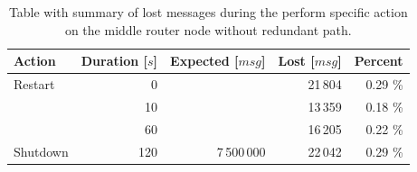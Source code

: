\begingroup
\setlength{\tabcolsep}{10pt} %
\renewcommand{\arraystretch}{1.35} %
	\begin{table}[H]
	\centering
	\caption{Table with summary of lost messages during the perform specific action on the middle router node without redundant path.}
	\label{tab:agent_redundant_lost}
	\begin{tabular}{|l|r|r|r|r|}
	\hline
	\rowcolor[HTML]{C5E3DF}
	\textbf{Action} & \textbf{Duration [$s$]} & \textbf{Expected [$msg$]} & \textbf{Lost [$msg$]} & \textbf{Percent} \\ \hline
	Restart & 0 & & 21\,804 & 0.29 \% \\ \cline{1-2} \cline{4-5}
	 & 10 & & 13\,359 & 0.18 \% \\ \cline{2-2} \cline{4-5}
	 & 60 & & 16\,205 & 0.22 \% \\ \cline{2-2} \cline{4-5}
	\multirow{-3}{*}{Shutdown} & 120 & \multirow{-4}{*}{7\,500\,000} & 22\,042 & 0.29 \% \\ \hline
	\end{tabular}
	\end{table}
\endgroup

